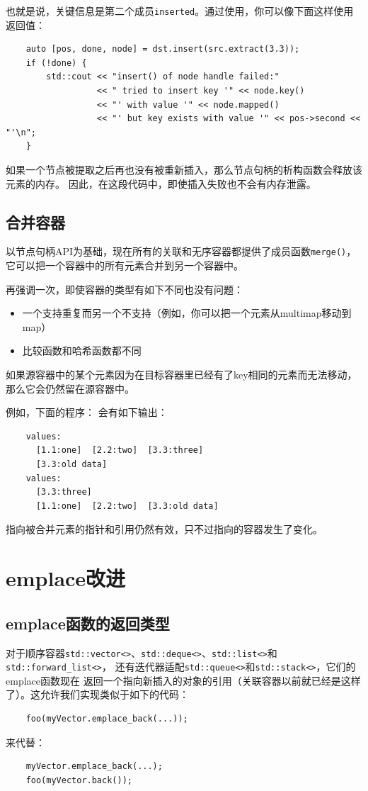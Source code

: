 也就是说，关键信息是第二个成员\texttt{inserted}。通过使用，你可以像下面这样使用返回值：
\begin{lstlisting}
    auto [pos, done, node] = dst.insert(src.extract(3.3));
    if (!done) {
        std::cout << "insert() of node handle failed:"
                  << " tried to insert key '" << node.key()
                  << "' with value '" << node.mapped()
                  << "' but key exists with value '" << pos->second << "'\n";
    }
\end{lstlisting}
如果一个节点被提取之后再也没有被重新插入，那么节点句柄的析构函数会释放该元素的内存。
因此，在这段代码中，即使插入失败也不会有内存泄露。

\subsection{合并容器}
以节点句柄API为基础，现在所有的关联和无序容器都提供了成员函数\texttt{merge()}，
它可以把一个容器中的所有元素合并到另一个容器中。

再强调一次，即使容器的类型有如下不同也没有问题：
\begin{itemize}
    \item 一个支持重复而另一个不支持（例如，你可以把一个元素从multimap移动到map）
    \item 比较函数和哈希函数都不同
\end{itemize}
如果源容器中的某个元素因为在目标容器里已经有了key相同的元素而无法移动，
那么它会仍然留在源容器中。

例如，下面的程序：
会有如下输出：
\begin{lstlisting}
    values:
      [1.1:one]  [2.2:two]  [3.3:three]
      [3.3:old data]
    values:
      [3.3:three]
      [1.1:one]  [2.2:two]  [3.3:old data]
\end{lstlisting}
指向被合并元素的指针和引用仍然有效，只不过指向的容器发生了变化。


\section{emplace改进}

\subsection{emplace函数的返回类型}
对于顺序容器\texttt{std::vector<>}、\texttt{std::deque<>}、\texttt{std::list<>}和\texttt{std::forward\_list<>}，
还有迭代器适配\texttt{std::queue<>}和\texttt{std::stack<>}，它们的emplace函数现在
返回一个指向新插入的对象的引用（关联容器以前就已经是这样了）。这允许我们实现类似于如下的代码：
\begin{lstlisting}
    foo(myVector.emplace_back(...));
\end{lstlisting}
来代替：
\begin{lstlisting}
    myVector.emplace_back(...);
    foo(myVector.back());
\end{lstlisting}


